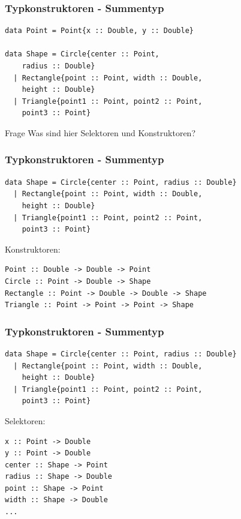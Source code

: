 \begin{frame}[fragile]
\frametitle{Typkonstruktoren - Summentyp} 
\begin{lstlisting}
data Point = Point{x :: Double, y :: Double}

data Shape = Circle{center :: Point, 
    radius :: Double}
  | Rectangle{point :: Point, width :: Double, 
    height :: Double}
  | Triangle{point1 :: Point, point2 :: Point, 
    point3 :: Point}
\end{lstlisting}

\begin{alertblock}{Frage}
Was sind hier Selektoren und Konstruktoren?
\end{alertblock}
\end{frame}

\begin{frame}[fragile]
\frametitle{Typkonstruktoren - Summentyp} 
\begin{lstlisting}
data Shape = Circle{center :: Point, radius :: Double}
  | Rectangle{point :: Point, width :: Double, 
    height :: Double}
  | Triangle{point1 :: Point, point2 :: Point, 
    point3 :: Point}
\end{lstlisting}
Konstruktoren: \pause
\begin{lstlisting}
Point :: Double -> Double -> Point
Circle :: Point -> Double -> Shape
Rectangle :: Point -> Double -> Double -> Shape
Triangle :: Point -> Point -> Point -> Shape
\end{lstlisting}
\end{frame}

\begin{frame}[fragile]
\frametitle{Typkonstruktoren - Summentyp}
\begin{lstlisting}
data Shape = Circle{center :: Point, radius :: Double}
  | Rectangle{point :: Point, width :: Double, 
    height :: Double}
  | Triangle{point1 :: Point, point2 :: Point, 
    point3 :: Point}
\end{lstlisting} 
Selektoren: \pause
\begin{lstlisting}
x :: Point -> Double
y :: Point -> Double
center :: Shape -> Point
radius :: Shape -> Double
point :: Shape -> Point
width :: Shape -> Double
...
\end{lstlisting}
\end{frame}
